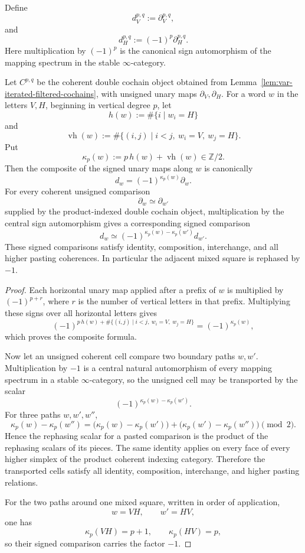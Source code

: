 \begin{definition}
\label{def:var-signed-bicomplex}
Define
\[
    d_V^{p,q}:=\partial_V^{p,q},
\]
and
\[
    d_H^{p,q}:=(-1)^p\partial_H^{p,q}.
\]
Here multiplication by \((-1)^p\) is the canonical sign automorphism of the mapping spectrum in the stable \(\infty\)-category.
\end{definition}

\begin{lemma}
\label{lem:var-koszul-rephasing}
Let \(C^{p,q}\) be the coherent double cochain object obtained from Lemma~\ref{lem:var-iterated-filtered-cochains}, with unsigned unary maps \(\partial_V,\partial_H\). For a word \(w\) in the letters \(V,H\), beginning in vertical degree \(p\), let
\[
    h(w):=\#\{i\mid w_i=H\}
\]
and
\[
    \operatorname{vh}(w)
    :=
    \#\{(i,j)\mid i<j,\ w_i=V,\ w_j=H\}.
\]
Put
\[
    \kappa_p(w)
    :=
    p\,h(w)+\operatorname{vh}(w)
    \in\mathbb Z/2.
\]
Then the composite of the signed unary maps along \(w\) is canonically
\[
    d_w
    =
    (-1)^{\kappa_p(w)}\partial_w.
\]
For every coherent unsigned comparison
\[
    \partial_w\simeq\partial_{w'}
\]
supplied by the product-indexed double cochain object, multiplication by the central sign automorphism gives a corresponding signed comparison
\[
    d_w
    \simeq
    (-1)^{\kappa_p(w)-\kappa_p(w')}d_{w'}.
\]
These signed comparisons satisfy identity, composition, interchange, and all higher pasting coherences. In particular the adjacent mixed square is rephased by \(-1\).
\end{lemma}

\begin{proof}
Each horizontal unary map applied after a prefix of \(w\) is multiplied by \((-1)^{p+r}\), where \(r\) is the number of vertical letters in that prefix. Multiplying these signs over all horizontal letters gives
\[
    (-1)^{
      p\,h(w)+
      \#\{(i,j)\mid i<j,\ w_i=V,\ w_j=H\}
    }
    =
    (-1)^{\kappa_p(w)},
\]
which proves the composite formula.

Now let an unsigned coherent cell compare two boundary paths \(w,w'\). Multiplication by \(-1\) is a central natural automorphism of every mapping spectrum in a stable \(\infty\)-category, so the unsigned cell may be transported by the scalar
\[
    (-1)^{\kappa_p(w)-\kappa_p(w')}.
\]
For three paths \(w,w',w''\),
\[
    \kappa_p(w)-\kappa_p(w'')
    =
    \bigl(\kappa_p(w)-\kappa_p(w')\bigr)
    +
    \bigl(\kappa_p(w')-\kappa_p(w'')\bigr)
    \pmod2.
\]
Hence the rephasing scalar for a pasted comparison is the product of the rephasing scalars of its pieces. The same identity applies on every face of every higher simplex of the product coherent indexing category. Therefore the transported cells satisfy all identity, composition, interchange, and higher pasting relations.

For the two paths around one mixed square, written in order of application,
\[
    w=VH,
    \qquad
    w'=HV,
\]
one has
\[
    \kappa_p(VH)=p+1,
    \qquad
    \kappa_p(HV)=p,
\]
so their signed comparison carries the factor \(-1\).
\end{proof}

